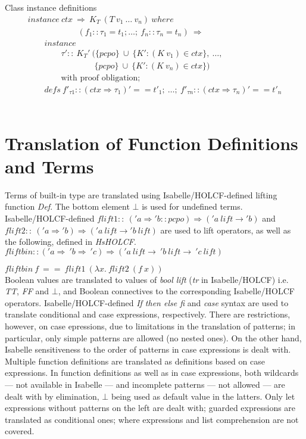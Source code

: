 \documentclass{llncs}
\begin{document}
\noindent Class instance definitions
$$\begin{array}{l}
instance \ ctx \ \Rightarrow \ K_T \ (T \ v_1 \ \ldots \ v_n) \ where \\ 
  \qquad \qquad \qquad (f_1::\tau_1 = t_1; \ldots; \ f_n::\tau_n = t_n)
  \ \Longrightarrow \\
  \qquad instance \\
  \qquad \qquad \tau' :: \ K_{T}' \ (\{pcpo\} \ \cup \ \{K':(K \ v_1)
  \in ctx\}, \ \ldots, \\
  \qquad \qquad \qquad \quad \quad 
         \{pcpo\} \ \cup \ \{K':(K \ v_n) \in ctx\}) \\
  \qquad \qquad \mbox{with \ proof \ obligation}; \\
  \qquad defs \ f'_{\tau 1} :: (ctx \Rightarrow \tau_1)' == t'_1; \ \ldots; \
  f'_{\tau n} :: (ctx \Rightarrow \tau_n)' == t'_n
\end{array}$$\\





\section{Translation of Function Definitions and Terms}

Terms of built-in type are translated using Isabelle/HOLCF-defined lifting function
\emph{Def}.  The bottom element $\bot$ is used for undefined terms.
Isabelle/HOLCF-defined $flift1 :: \ ('a \Rightarrow 'b::pcpo) \Rightarrow ('a \ lift
\to 'b)$ and $flift2 :: \ ('a \Rightarrow 'b) \Rightarrow ('a \ lift \to 'b \ 
lift)$ are used to lift operators, as well as the following, defined in
\emph{HsHOLCF}.\\

$fliftbin :: ('a \Rightarrow \ 'b \Rightarrow \ 'c) 
  \Rightarrow ('a \ lift \to \ 'b \ lift \to \ 'c \ lift) $
 
$fliftbin \ f \ == \ flift1 \ (\lambda x. \ flift2 \ (f \ x))$\\

\noindent Boolean values are translated to values of \emph{bool lift} 
(\emph{tr} in Isabelle/HOLCF) i.e.  \emph{TT}, \emph{FF} and $\bot$, and
Boolean connectives to the corresponding Isabelle/HOLCF operators.
Isabelle/HOLCF-defined \emph{If then else fi} and \emph{case} syntax are used
to translate conditional and case expressions, respectively.  There are
restrictions, however, on case epressions, due to limitations in the
translation of patterns; in particular, only simple patterns are allowed (no
nested ones). On the other hand, Isabelle sensitiveness to the order of
patterns in case expressions is dealt with. Multiple function definitions are
translated as definitions based on case expressions. In function definitions
as well as in case expressions, both wildcards --- not available in Isabelle
--- and incomplete patterns --- not allowed --- are dealt with by elimination,
$\bot$ being used as default value in the latters. Only let expressions
without patterns on the left are dealt with; guarded expressions are
translated as conditional ones; where expressions and list comprehension are
not covered.
\end{document}
